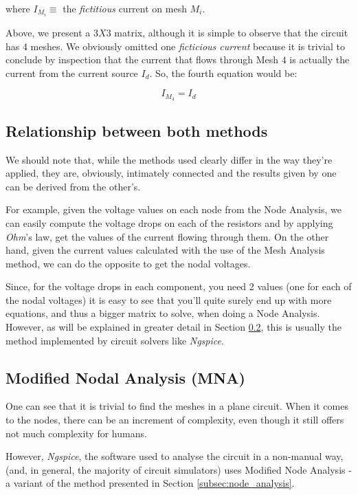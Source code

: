 where $I_{M_i}\equiv$ the \textit{fictitious} current on mesh $M_i$.

Above, we present a $3X3$ matrix, although it is simple to observe that the circuit has 4 meshes. We obviously omitted one \textit{ficticious current} because it is trivial to conclude by inspection that the current that flows through Mesh $4$ is actually the current from the current source $I_d$. So, the fourth equation would be:

\begin{equation}
    I_{M_4}=I_d
\end{equation}

\subsection{Relationship between both methods}
\label{subsec:relation_mesh_node}

We should note that, while the methods used clearly differ in the way they're applied, they are, obviously, intimately connected and the results given by one can be derived from the other's.

For example, given the voltage values on each node from the Node Analysis, we can easily compute the voltage drops on each of the resistors and by applying \textit{Ohm}'s law, get the values of the current flowing through them.
On the other hand, given the current values calculated with the use of the Mesh Analysis method, we can do the opposite to get the nodal voltages.

Since, for the voltage drops in each component, you need 2 values (one for each of the nodal voltages) it is easy to see that you'll quite surely end up with more equations, and thus a bigger matrix to solve, when doing a Node Analysis. However, as will be explained in greater detail in Section \ref{subsec_mna}, this is usually the method implemented by circuit solvers like \textit{Ngspice}.

\subsection{Modified Nodal Analysis (MNA)}
\label{subsec_mna}

One can see that it is trivial to find the meshes in a plane circuit. When it comes to the nodes, there can be an increment of complexity, even though it still offers not much complexity for humans.

However, \textit{Ngspice}, the software used to analyse the circuit in a non-manual way, (and, in general, the majority of circuit simulators) uses Modified Node Analysis - a variant of the method presented in Section \ref{subsec:node_analysis}.

